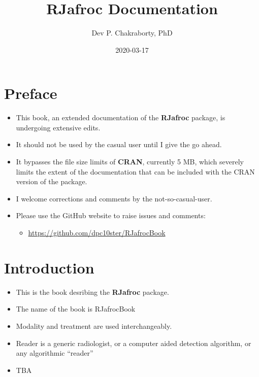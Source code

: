 \documentclass[
]{book}
\title{RJafroc Documentation}
\author{Dev P. Chakraborty, PhD}
\date{2020-03-17}
\providecommand{\tightlist}{%
  \setlength{\itemsep}{0pt}\setlength{\parskip}{0pt}}
\begin{document}
\maketitle

{
\setcounter{tocdepth}{1}
\tableofcontents
}
\hypertarget{preface}{%
\chapter*{Preface}\label{preface}}

\begin{itemize}
\tightlist
\item
  This book, an extended documentation of the \textbf{RJafroc} package, is undergoing extensive edits.
\item
  It should not be used by the casual user until I give the go ahead.
\item
  It bypasses the file size limits of \textbf{CRAN}, currently 5 MB, which severely limits the extent of the documentation that can be included with the CRAN version of the package.
\item
  I welcome corrections and comments by the not-so-casual-user.
\item
  Please use the GitHub website to raise issues and comments:

  \begin{itemize}
  \tightlist
  \item
    \url{https://github.com/dpc10ster/RJafrocBook}
  \end{itemize}
\end{itemize}

\hypertarget{intro}{%
\chapter{Introduction}\label{intro}}

\begin{itemize}
\tightlist
\item
  This is the book desribing the \textbf{RJafroc} package.
\item
  The name of the book is RJafrocBook
\item
  Modality and treatment are used interchangeably.
\item
  Reader is a generic radiologist, or a computer aided detection algorithm, or any algorithmic ``reader''
\item
  TBA
\end{itemize}
\end{document}

